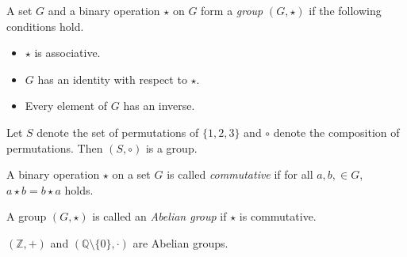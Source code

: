 \begin{definition}
  A set $G$ and a binary operation $\star$ on $G$ form a \emph{group}
  $(G, \star)$ if the following conditions hold.
  \begin{itemize}
    \item $\star$ is associative.
    \item $G$ has an identity with respect to $\star$.
    \item Every element of $G$ has an inverse.
  \end{itemize}
\end{definition}

\begin{example}
  Let $S$ denote the set of permutations of $\{1, 2, 3\}$ and $\circ$
  denote the composition of permutations. Then $(S, \circ)$ is a group.
\end{example}

\begin{definition}
  A binary operation $\star$ on a set $G$ is called \emph{commutative} if
  for all $a, b, \in G$, $a \star b = b \star a$ holds.
\end{definition}

\begin{definition}
  A group $(G, \star)$ is called an \emph{Abelian group} if $\star$ is
  commutative.
\end{definition}

\begin{example}
  $(\mathbb{Z}, +)$ and $(\mathbb{Q} \setminus \{0\}, \cdot)$ are Abelian
  groups.
\end{example}